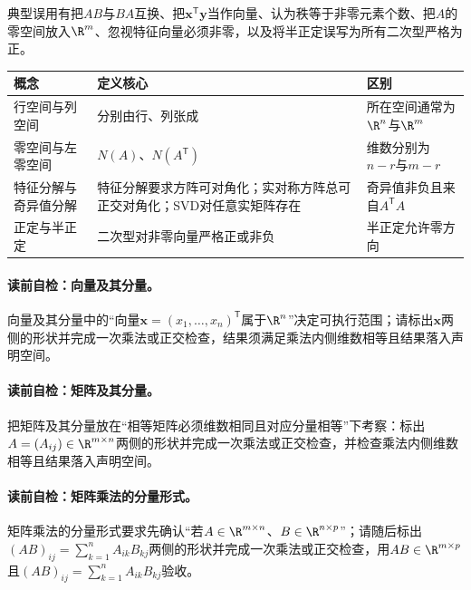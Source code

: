 \begin{warningbox}\label{schema:V1-C02:CH-30}
典型误用有把$AB$与$BA$互换、把$\boldsymbol{x}^{\mathsf T}\boldsymbol{y}$当作向量、认为秩等于非零元素个数、把$A$的零空间放入$\R^m$、忽视特征向量必须非零，以及将半正定误写为所有二次型严格为正。
\end{warningbox}
\begin{comparisonbox}\label{schema:V1-C02:CH-31}
\begin{tabularx}{\linewidth}{@{}lXX@{}}
\toprule
概念 & 定义核心 & 区别\\
\midrule
行空间与列空间 & 分别由行、列张成 & 所在空间通常为$\R^n$与$\R^m$\\
零空间与左零空间 & $N(A)$、$N(A^{\mathsf T})$ & 维数分别为$n-r$与$m-r$\\
特征分解与奇异值分解 & 特征分解要求方阵可对角化；实对称方阵总可正交对角化；SVD对任意实矩阵存在 & 奇异值非负且来自$A^{\mathsf T}A$\\
正定与半正定 & 二次型对非零向量严格正或非负 & 半正定允许零方向\\
\bottomrule
\end{tabularx}
\end{comparisonbox}

\paragraph{读前自检：向量及其分量。}向量及其分量中的“向量$\boldsymbol{x}=(x_1,\ldots,x_n)^{\mathsf T}$属于$\R^n$”决定可执行范围；请标出$\boldsymbol{x}$两侧的形状并完成一次乘法或正交检查，结果须满足乘法内侧维数相等且结果落入声明空间。\par
\paragraph{读前自检：矩阵及其分量。}把矩阵及其分量放在“相等矩阵必须维数相同且对应分量相等”下考察：标出$A=(A_{ij})\in\R^{m\times n}$两侧的形状并完成一次乘法或正交检查，并检查乘法内侧维数相等且结果落入声明空间。\par
\paragraph{读前自检：矩阵乘法的分量形式。}矩阵乘法的分量形式要求先确认“若$A\in\R^{m\times n}$、$B\in\R^{n\times p}$”；请随后标出$(AB)_{ij}=\sum_{k=1}^{n}A_{ik}B_{kj}$两侧的形状并完成一次乘法或正交检查，用$AB\in\R^{m\times p}$且$(AB)_{ij}=\sum_{k=1}^{n}A_{ik}B_{kj}$验收。\par
